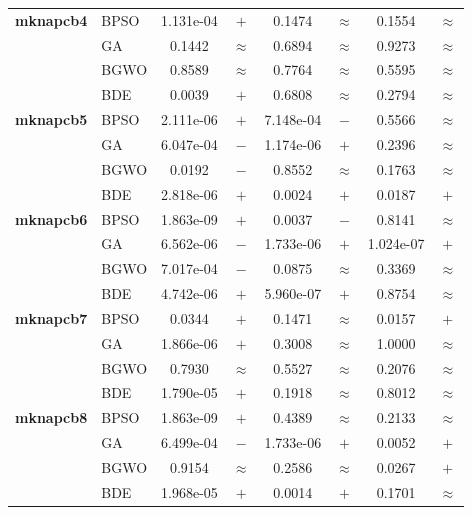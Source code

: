 \documentclass[journal,article,submit,moreauthors]{Definitions/mdpi}
\begin{document}
\begin{table}[htbp]
\begin{tabular*}{\textwidth}{@{\extracolsep{\fill}}llcccccc@{}}
    \midrule
    \textbf{mknapcb4}  & BPSO  & 1.131e-04 & $+$ & 0.1474 & $\approx$ & 0.1554 & $\approx$ \\
                       & GA    & 0.1442 & $\approx$ & 0.6894 & $\approx$ & 0.9273 & $\approx$ \\
                       & BGWO  & 0.8589 & $\approx$ & 0.7764 & $\approx$ & 0.5595 & $\approx$ \\
                       & BDE   & 0.0039 & $+$ & 0.6808 & $\approx$ & 0.2794 & $\approx$ \\
    \midrule
    \textbf{mknapcb5}  & BPSO  & 2.111e-06 & $+$ & 7.148e-04 & $-$ & 0.5566 & $\approx$ \\
                       & GA    & 6.047e-04 & $-$ & 1.174e-06 & $+$ & 0.2396 & $\approx$ \\
                       & BGWO  & 0.0192 & $-$ & 0.8552 & $\approx$ & 0.1763 & $\approx$ \\
                       & BDE   & 2.818e-06 & $+$ & 0.0024 & $+$ & 0.0187 & $+$ \\
    \midrule
    \textbf{mknapcb6}  & BPSO  & 1.863e-09 & $+$ & 0.0037 & $-$ & 0.8141 & $\approx$ \\
                       & GA    & 6.562e-06 & $-$ & 1.733e-06 & $+$ & 1.024e-07 & $+$ \\
                       & BGWO  & 7.017e-04 & $-$ & 0.0875 & $\approx$ & 0.3369 & $\approx$ \\
                       & BDE   & 4.742e-06 & $+$ & 5.960e-07 & $+$ & 0.8754 & $\approx$ \\
    \midrule
    \textbf{mknapcb7}  & BPSO  & 0.0344 & $+$ & 0.1471 & $\approx$ & 0.0157 & $+$ \\
                       & GA    & 1.866e-06 & $+$ & 0.3008 & $\approx$ & 1.0000 & $\approx$ \\
                       & BGWO  & 0.7930 & $\approx$ & 0.5527 & $\approx$ & 0.2076 & $\approx$ \\
                       & BDE   & 1.790e-05 & $+$ & 0.1918 & $\approx$ & 0.8012 & $\approx$ \\
    \midrule
    \textbf{mknapcb8}  & BPSO  & 1.863e-09 & $+$ & 0.4389 & $\approx$ & 0.2133 & $\approx$ \\
                       & GA    & 6.499e-04 & $-$ & 1.733e-06 & $+$ & 0.0052 & $+$ \\
                       & BGWO  & 0.9154 & $\approx$ & 0.2586 & $\approx$ & 0.0267 & $+$ \\
                       & BDE   & 1.968e-05 & $+$ & 0.0014 & $+$ & 0.1701 & $\approx$ \\

\end{tabular*}
\end{table}
\end{document}
